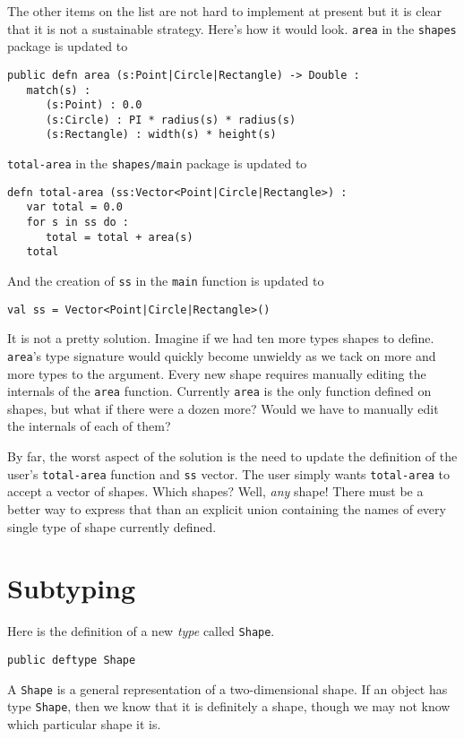 \documentclass[10pt,oneside]{book}
\begin{document}
The other items on the list are not hard to implement at present but it is clear that it is not a sustainable strategy. Here's how it would look.
\texttt{\frenchspacing area} in the \texttt{\frenchspacing shapes} package is updated to
\begin{lstlisting}
public defn area (s:Point|Circle|Rectangle) -> Double :
   match(s) :
      (s:Point) : 0.0
      (s:Circle) : PI * radius(s) * radius(s)
      (s:Rectangle) : width(s) * height(s)
\end{lstlisting}
\texttt{\frenchspacing total-area} in the \texttt{\frenchspacing shapes/main} package is updated to
\begin{lstlisting}
defn total-area (ss:Vector<Point|Circle|Rectangle>) :
   var total = 0.0
   for s in ss do :
      total = total + area(s)
   total  
\end{lstlisting}
And the creation of \texttt{\frenchspacing ss} in the \texttt{\frenchspacing main} function is updated to
\begin{lstlisting}
val ss = Vector<Point|Circle|Rectangle>()
\end{lstlisting}
It is not a pretty solution. Imagine if we had ten more types shapes to define. \texttt{\frenchspacing area}'s type signature would quickly become unwieldy as we tack on more and more types to the argument. Every new shape requires manually editing the internals of the \texttt{\frenchspacing area} function. Currently \texttt{\frenchspacing area} is the only function defined on shapes, but what if there were a dozen more? Would we have to manually edit the internals of each of them? 

By far, the worst aspect of the solution is the need to update the definition of the user's \texttt{\frenchspacing total-area} function and \texttt{\frenchspacing ss} vector. The user simply wants \texttt{\frenchspacing total-area} to accept a vector of shapes. Which shapes? Well, {\em any} shape! There must be a better way to express that than an explicit union containing the names of every single type of shape currently defined.

\section{Subtyping}
Here is the definition of a new {\em type} called \texttt{\frenchspacing Shape}.
\begin{lstlisting}
public deftype Shape
\end{lstlisting}
A \texttt{\frenchspacing Shape} is a general representation of a two-dimensional shape. If an object has type \texttt{\frenchspacing Shape}, then we know that it is definitely a shape, though we may not know which particular shape it is. 
\end{document}
